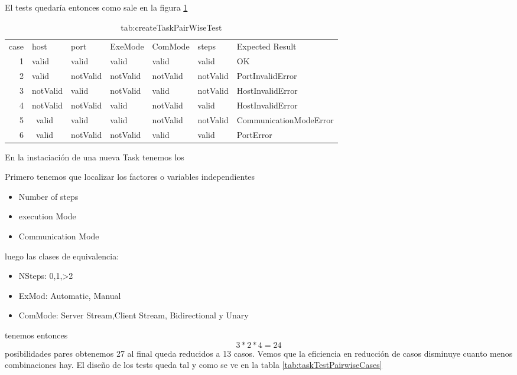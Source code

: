 El tests quedaría entonces como sale en la figura \ref{tab:createTaskPairWiseTest}

\begin{table}[H]
    \small
    \begin{tabular}{rllllll}
        case & host     & port     & ExeMode  & ComMode  & steps    & Expected Result        \\
        1    & valid    & valid    & valid    & valid    & valid    & OK                     \\
        2    & valid    & notValid & notValid & notValid & notValid & PortInvalidError       \\
        3    & notValid & valid    & notValid & valid    & notValid & HostInvalidError       \\
        4    & notValid & notValid & valid    & notValid & valid    & HostInvalidError       \\
        5    & ~valid   & valid    & valid    & notValid & notValid & CommunicationModeError \\
        6    & ~valid   & notValid & notValid & valid    & valid    & PortError
    \end{tabular}
    \caption{tab:createTaskPairWiseTest}\label{tab:createTaskPairWiseTest}
\end{table}

En la instaciación de una nueva Task tenemos los

Primero tenemos que localizar los factores o variables independientes

\begin{itemize}
    \item Number of steps
    \item execution Mode
    \item Communication Mode
\end{itemize}

luego las clases de equivalencia:

\begin{itemize}
    \item NSteps: 0,1,>2
    \item ExMod: Automatic, Manual
    \item ComMode: Server Stream,Client Stream, Bidirectional y Unary
\end{itemize}

tenemos entonces \[ 3*2*4 = 24 \] posibilidades pares obtenemos 27 al final queda reducidos a 13 casos. Vemos que la eficiencia en reducción de casos disminuye cuanto menos combinaciones hay. El diseño de los tests queda tal y como se ve en la tabla \ref{tab:taskTestPairwiseCases}

